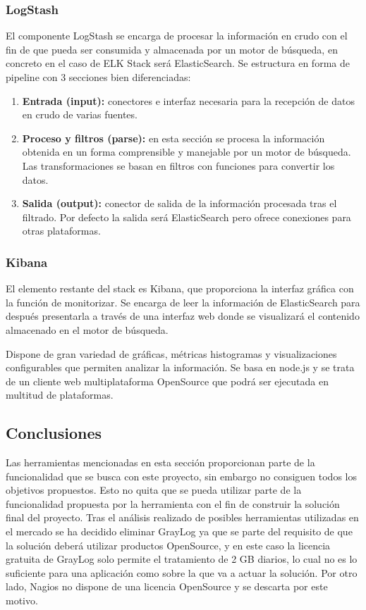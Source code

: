 \subsubsection{LogStash}

El componente LogStash  se encarga de procesar la información en crudo con el fin de que pueda ser consumida y almacenada por un motor de búsqueda, en concreto en el caso de ELK Stack será ElasticSearch. Se estructura en forma de pipeline con 3 secciones bien diferenciadas:

\begin{enumerate}
\item \textbf{Entrada (input):} conectores e interfaz necesaria para la recepción de datos en crudo de varias fuentes.
\item \textbf{Proceso y filtros (parse):} en esta sección se procesa la información obtenida en un forma comprensible y manejable por un motor de búsqueda. Las transformaciones se basan en filtros con funciones para convertir los datos.
\item \textbf{Salida (output):} conector de salida de la información procesada tras el filtrado. Por defecto la salida será ElasticSearch pero ofrece conexiones para otras plataformas.
\end{enumerate}

\subsubsection{Kibana}

El elemento restante del stack es Kibana, que proporciona la interfaz gráfica con la función de monitorizar. Se encarga de leer la información de ElasticSearch para después presentarla a través de una interfaz web donde se visualizará el contenido almacenado en el motor de búsqueda.

Dispone de gran variedad de gráficas, métricas histogramas y visualizaciones configurables que permiten analizar la información. Se basa en node.js y se trata de un cliente web multiplataforma OpenSource que podrá ser ejecutada en multitud de plataformas.


\subsection{Conclusiones}

Las herramientas mencionadas en esta sección proporcionan parte de la funcionalidad que se busca con este proyecto, sin embargo no consiguen todos los objetivos propuestos. Esto no quita que se pueda utilizar parte de la funcionalidad propuesta por la herramienta con el fin de construir la solución final del proyecto. Tras el análisis realizado de posibles herramientas utilizadas en el mercado se ha decidido eliminar GrayLog ya que se parte del requisito de que la solución deberá utilizar productos OpenSource, y en este caso la licencia gratuita de GrayLog solo permite el tratamiento de 2 GB diarios, lo cual no es lo suficiente para una aplicación como sobre la que va a actuar la solución. Por otro lado, Nagios no dispone de una licencia OpenSource y se descarta por este motivo.


